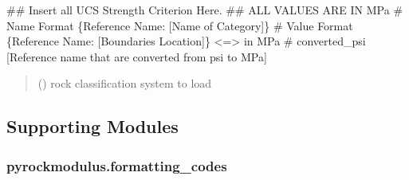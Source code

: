 \documentclass[letterpaper,10pt,english]{sphinxmanual}
\begin{document}
\begin{fulllineitems}
\label{\detokenize{pyrockmodulus:pyrockmodulus.rock_variables.ucs_strength_criteria}}
\pysigstartsignatures
{}
\pysigstopsignatures
\sphinxAtStartPar
\#\# Insert all UCS Strength Criterion Here.     \#\# ALL VALUES ARE IN MPa
\# Name Format \{Reference Name: {[}Name of Category{]}\}
\# Value Format \{Reference Name: {[}Boundaries Location{]}\}  \textless{}=\textgreater{} in MPa
\# converted\_psi {[}Reference name that are converted from psi to MPa{]}
\begin{quote}\begin{description}
\sphinxAtStartPar
{} () \textendash{} rock classification system to load

\sphinxAtStartPar


\sphinxAtStartPar


\end{description}\end{quote}

\end{fulllineitems}



\subsection{Supporting Modules}
\label{\detokenize{pyrockmodulus:supporting-modules}}

\subsubsection{pyrockmodulus.formatting\_codes}
\label{\detokenize{pyrockmodulus:module-pyrockmodulus.formatting_codes}}\label{\detokenize{pyrockmodulus:pyrockmodulus-formatting-codes}}
\end{document}
